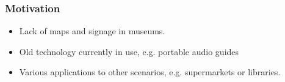 \frametitle{Motivation}
\begin{itemize}
	\item Lack of maps and signage in museums.
	\item Old technology currently in use, e.g. portable audio guides
	\item Various applications to other scenarios, e.g. supermarkets or libraries.
\end{itemize}